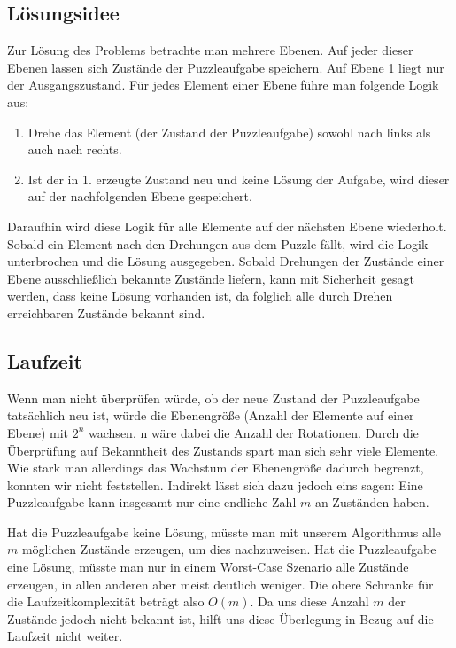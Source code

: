 \subsection {Lösungsidee}
	Zur Lösung des Problems betrachte man mehrere Ebenen. Auf jeder dieser Ebenen lassen sich Zustände der Puzzleaufgabe speichern. 
	Auf Ebene 1 liegt nur der Ausgangszustand. Für jedes Element einer Ebene führe man folgende Logik aus:

	\begin{enumerate}
		\item Drehe das Element (der Zustand der Puzzleaufgabe) sowohl nach links als auch nach rechts.
		\item Ist der in 1. erzeugte Zustand neu und keine Lösung der Aufgabe, wird dieser auf der nachfolgenden Ebene gespeichert.
	\end{enumerate}

	Daraufhin wird diese Logik für alle Elemente auf der nächsten Ebene wiederholt.
	Sobald ein Element nach den Drehungen aus dem Puzzle fällt, wird die Logik unterbrochen und die Lösung ausgegeben. Sobald Drehungen der Zustände einer Ebene ausschließlich bekannte Zustände liefern, kann mit Sicherheit gesagt werden, dass keine Lösung vorhanden ist, da folglich alle durch Drehen erreichbaren Zustände bekannt sind.
	
\subsection{Laufzeit}
	Wenn man nicht überprüfen würde, ob der neue Zustand der Puzzleaufgabe tatsächlich neu ist, würde die Ebenengröße (Anzahl der Elemente auf einer Ebene) mit \(2^n\) wachsen.  
	n wäre dabei die Anzahl der Rotationen. Durch die Überprüfung auf Bekanntheit des Zustands spart man sich sehr viele Elemente. 
	Wie stark man allerdings das Wachstum der Ebenengröße dadurch begrenzt, konnten wir nicht feststellen. Indirekt lässt sich dazu jedoch eins sagen: 
	Eine Puzzleaufgabe kann insgesamt nur eine endliche Zahl \(m\) an Zuständen haben. 

	Hat die Puzzleaufgabe keine Lösung, müsste man mit unserem Algorithmus alle \(m\) möglichen Zustände erzeugen, um dies nachzuweisen.
	Hat die Puzzleaufgabe eine Lösung, müsste man nur in einem Worst-Case Szenario alle  Zustände erzeugen, in allen anderen aber meist deutlich weniger.
	Die obere Schranke für die Laufzeitkomplexität beträgt also \(O(m)\). Da uns diese Anzahl \(m\) der Zustände jedoch nicht bekannt ist, 
	hilft uns diese Überlegung in Bezug auf die Laufzeit nicht weiter. 

